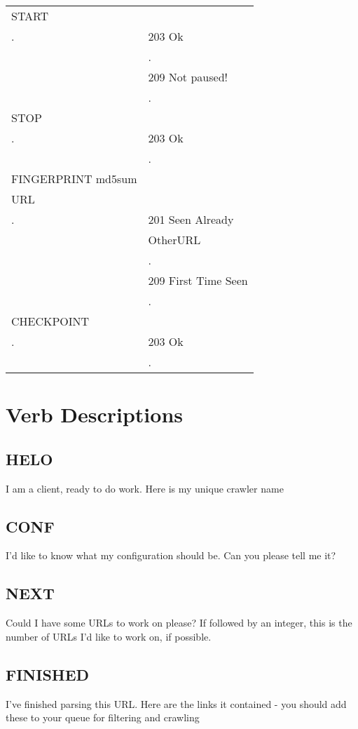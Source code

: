 \begin{center}
\begin{supertabular}{|l|l|}
\hline
START&\\
.&203 Ok\\
&.\\
&209 Not paused!\\
&.\\
\hline
STOP&\\
.&203 Ok\\
&.\\
\hline
FINGERPRINT md5sum&\\
URL&\\
.&201 Seen Already\\
&OtherURL\\
&.\\
&209 First Time Seen\\
&.\\
\hline
CHECKPOINT&\\
.&203 Ok\\
&.\\
\end{supertabular}
\end{center}

\section{Verb Descriptions}
\subsection{HELO}
I am a client, ready to do work. Here is my unique crawler name

\subsection{CONF}
I'd like to know what my configuration should be. Can you please tell me it?

\subsection{NEXT}
Could I have some URLs to work on please? If followed by an integer, this is the number of URLs I'd like to work on, if possible.

\subsection{FINISHED}
I've finished parsing this URL. Here are the links it contained - you should add these to your queue for filtering and crawling

